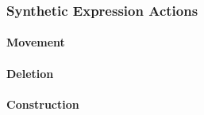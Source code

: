 \documentclass{article}
\begin{document}
\subsubsection{Synthetic Expression Actions}

\paragraph{Movement}
\begin{mathpar}
\end{mathpar}

\paragraph{Deletion}
\begin{mathpar}
\end{mathpar}

\paragraph{Construction}
\begin{mathpar}

\end{mathpar}

\begin{mathpar}



\end{mathpar}

\begin{mathpar}

\end{mathpar}
\end{document}
